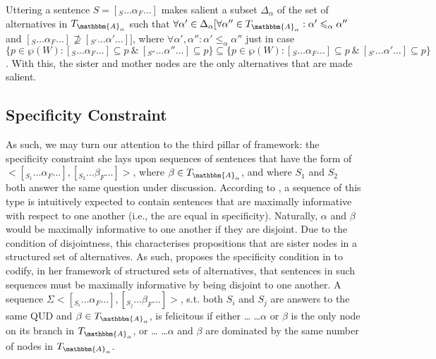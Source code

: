 Uttering a sentence $S=[_S\ldots\alpha_F\ldots]$ makes salient a subset $\Delta_\alpha$ of the set of alternatives in $T_{\mathbbm{A}_\alpha}$ such that $\forall\alpha'\in\Delta_\alpha[\forall\alpha''\in T_{\mathbbm{A}_\alpha}: \alpha'\leqslant_\alpha \alpha''$ and $[_{S}\ldots\alpha_F\ldots]\not\supseteq[_{S'}\ldots\alpha'\ldots]]$, where $\forall\alpha',\alpha'':\alpha'\leqslant_\alpha \alpha''$ just in case $\{p\in\wp(W):[_S\ldots\alpha_F\ldots]\subseteq p~\&~[_{S''}\ldots\alpha''\ldots]\subseteq p\}\subseteq\{p\in\wp(W):[_S\ldots\alpha_F\ldots]\subseteq p~\&~[_{S'}\ldots\alpha'\ldots]\subseteq p\}$.
\xe
With this, the sister and mother nodes are the only alternatives that are made salient. 


\subsection{Specificity Constraint}
As such, we may turn our attention to the third pillar of  framework: the specificity constraint she lays upon sequences of sentences that have the form of $<[_{S_1}\ldots\alpha_F\ldots],[_{S_2}\ldots\beta_F\ldots]>$, where $\beta\in T_{\mathbbm{A}_\alpha}$, and where $S_1$ and $S_2$ both answer the same question under discussion. According to \textcite{Ippolito2020}, a sequence of this type is intuitively expected to contain sentences that are maximally informative with respect to one another (i.e., the are equal in specificity). Naturally, $\alpha$ and $\beta$ would be maximally informative to one another if they are disjoint. Due to the condition of disjointness, this characterises propositions that are sister nodes in a structured set of alternatives. As such, \textcite{Ippolito2020} proposes the specificity condition in  to codify, in her framework of structured sets of alternatives, that sentences in such sequences must be maximally informative by being disjoint to one another.
\pex{}
{}
A sequence $\Sigma<[_{S_i}\ldots\alpha_F\ldots],[_{S_j}\ldots\beta_F\ldots]>$, s.t. both
$S_i$ and $S_j$ are answers to the same QUD and $\beta\in T_{\mathbbm{A}_\alpha}$, is felicitous if either \dots
\a{} \dots $\alpha$ or $\beta$ is the only node on its branch in $T_{\mathbbm{A}_\alpha}$, or \dots {}
\a{} \dots $\alpha$ and $\beta$ are dominated by the same number of nodes in $T_{\mathbbm{A}_\alpha}$.\\\emptyfill\parencite[p.~643]{Ippolito2020}
